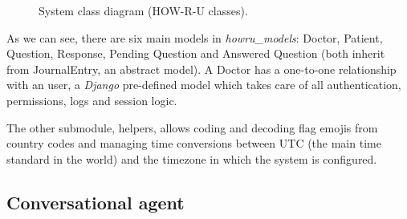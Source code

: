 \documentclass[12pt,english]{article}
\begin{document}
\begin{figure}[H]
    \caption{System class diagram (HOW-R-U classes).}
\end{figure}

As we can see, there are six main models in \emph{howru\_models}: Doctor, Patient, Question, Response, Pending Question and Answered Question (both inherit from JournalEntry, an abstract model). A Doctor has a one-to-one relationship with an user, a \emph{Django} pre-defined model which takes care of all authentication, permissions, logs and session logic.

The other submodule, helpers, allows coding and decoding flag emojis from country codes and managing time conversions between UTC (the main time standard in the world) and the timezone in which the system is configured.

\subsection{Conversational agent}
\end{document}
